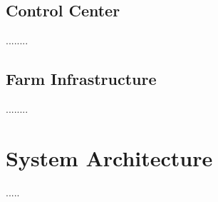 \documentclass[12pt]{article}
\begin{document}

\subsection{Control Center} %

........

\subsection{Farm Infrastructure} %

........

\newpage
\section{System Architecture} %

.....


\end{document}
